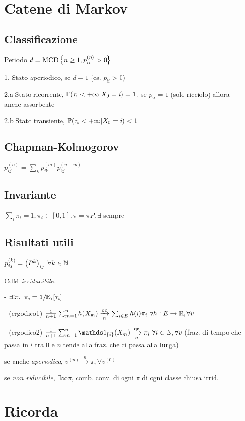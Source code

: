 \section{Catene di Markov}
\subsection{Classificazione}

Periodo $d=\operatorname{MCD}\left\{n\geq 1,p^{( n)}_{ii} >0\right\}$

1. Stato aperiodico, se $d=1$ (es. $p_{ii} >0$)

2.a Stato ricorrente, $\mathbb P( \tau_i < +\infty |X_0 =i) =1$, se $p_{ii} =1$ (solo ricciolo) allora anche assorbente

2.b Stato transiente, $\mathbb P( \tau_i < +\infty |X_0 =i) < 1$
\subsection{Chapman-Kolmogorov}

$p^{( n)}_{ij} =\sum\nolimits_k p^{( m)}_{ik} p^{( n-m)}_{kj}$
\subsection{Invariante}

$\sum\nolimits_i \pi_i =1,\pi_i \in [ 0,1] ,\pi =\pi P,\exists $ sempre
\subsection{Risultati utili}

$p^{(k)}_{ij} =\left( P^k\right)_{ij} \ \forall k\in \NN$

CdM \textit{irriducibile:}

- $\exists !\pi ,\ \pi_i =1/\mathbb E_i[ \tau_i]$

- (ergodico1) $\frac{1}{n+1}\sum\nolimits^n_{m=1} h( X_m)\xrightarrow[n]{\text{qc}}\sum\nolimits_{i\in E} h( i) \pi_i \ \forall h:E\rightarrow \RR ,\forall v$

- (ergodico2) $\frac{1}{n+1}\sum\nolimits^n_{m=1}\Ind_{\{i\}}( X_m)\xrightarrow[n]{\text{qc}} \pi_i \ \forall i\in E,\forall v$ (fraz. di tempo che passa in $i$ tra $0$ e $n$ tende alla fraz. che ci passa alla lunga)

se anche \textit{aperiodica}, $v^{( n)}\xrightarrow{n} \pi ,\forall v^{( 0)}$

se \textit{non riducibile}, $\exists \infty \pi $, comb. conv. di ogni $\pi $ di ogni classe chiusa irrid.
\section{Ricorda}

